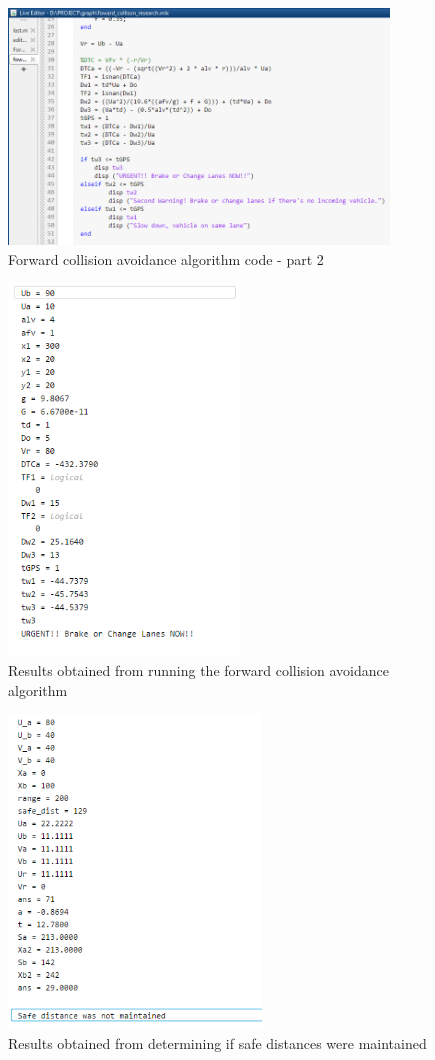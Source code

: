 \documentclass[12pt]{report}
\begin{document}
\begin{figure}[!ht]
	\includegraphics[width=0.9\textwidth]{xyz2.png}
	\caption{Forward collision avoidance algorithm code - part 2 }
	\label{fig}
\end{figure}

\begin{figure}[!htp]
	\includegraphics[width=0.55\textwidth]{Capture.png}
	\caption{Results obtained from running the forward collision avoidance algorithm}
	\label{fig}
\end{figure}

\begin{figure}[!htp]
	\includegraphics[width=0.6\textwidth]{safedistances.png}
	\caption{Results obtained from determining if safe distances were maintained}
	\label{fig}
\end{figure}
\end{document}
